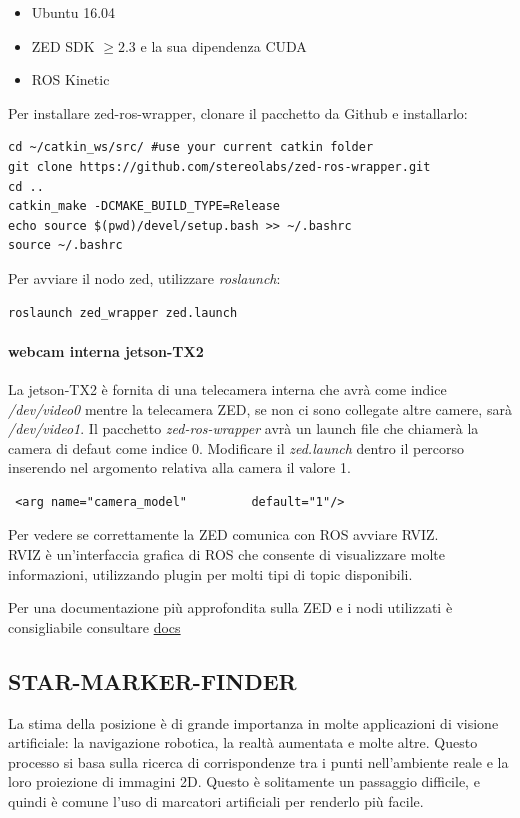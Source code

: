 \documentclass[a4paper]{article}
\begin{document}
\begin{itemize}
\item Ubuntu 16.04
\item ZED SDK $\ge 2.3 $   e la sua dipendenza CUDA
\item ROS Kinetic
\end{itemize}

Per installare zed-ros-wrapper, clonare il pacchetto da Github e installarlo:
\begin{verbatim}
cd ~/catkin_ws/src/ #use your current catkin folder
git clone https://github.com/stereolabs/zed-ros-wrapper.git
cd ..
catkin_make -DCMAKE_BUILD_TYPE=Release
echo source $(pwd)/devel/setup.bash >> ~/.bashrc
source ~/.bashrc
\end{verbatim}

Per avviare il nodo zed, utilizzare \textit{roslaunch}:
\begin{verbatim}
roslaunch zed_wrapper zed.launch
\end{verbatim}

\paragraph{webcam interna jetson-TX2}
La jetson-TX2 è fornita di una telecamera interna che avrà come indice \textit{/dev/video0} mentre la telecamera ZED, se non ci sono collegate altre camere, sarà \textit{/dev/video1}. Il pacchetto \textit{zed-ros-wrapper} avrà un launch file che chiamerà la camera di defaut come indice 0. Modificare il \textit{zed.launch} dentro il percorso   inserendo nel argomento relativa alla camera il valore 1.
\begin{verbatim}
 <arg name="camera_model"         default="1"/>
\end{verbatim}


Per vedere se correttamente la ZED comunica con ROS avviare RVIZ.
\\
RVIZ è un'interfaccia grafica di ROS che consente di visualizzare molte informazioni, utilizzando plugin per molti tipi di topic disponibili.





Per una documentazione più approfondita sulla ZED e i nodi utilizzati è consigliabile consultare 
\textcolor{red}{\href{https://www.stereolabs.com/docs/getting-started/}{docs}}

\subsection{STAR-MARKER-FINDER}
La stima della posizione è di grande importanza in molte applicazioni di visione artificiale: la navigazione robotica, la realtà aumentata e molte altre. Questo processo si basa sulla ricerca di corrispondenze tra i punti nell'ambiente reale e la loro proiezione di immagini 2D. Questo è solitamente un passaggio difficile, e quindi è comune l'uso di marcatori artificiali per renderlo più facile.
\end{document}
